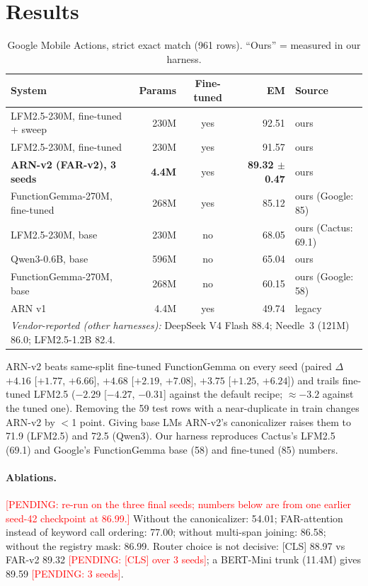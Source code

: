 \documentclass[11pt]{article}
\newcommand{\PENDING}[1]{\textcolor{red}{[PENDING: #1]}}
\newcommand{\arn}{ARN-v2}
\begin{document}
\section{Results}\label{sec:results}
\begin{table}[t]\centering\small
\caption{Google Mobile Actions, strict exact match (961 rows). ``Ours'' = measured in our harness.}
\begin{tabular}{lrcrl}\toprule
System & Params & Fine-tuned & EM & Source\\\midrule
LFM2.5-230M, fine-tuned + sweep & 230M & yes & 92.51 & ours\\
LFM2.5-230M, fine-tuned & 230M & yes & 91.57 & ours\\
\textbf{\arn{} (FAR-v2), 3 seeds} & \textbf{4.4M} & yes & \textbf{89.32 $\pm$ 0.47} & ours\\
FunctionGemma-270M, fine-tuned & 268M & yes & 85.12 & ours (Google: 85)\\
LFM2.5-230M, base & 230M & no & 68.05 & ours (Cactus: 69.1)\\
Qwen3-0.6B, base & 596M & no & 65.04 & ours\\
FunctionGemma-270M, base & 268M & no & 60.15 & ours (Google: 58)\\
ARN v1 & 4.4M & yes & 49.74 & legacy\\\midrule
\multicolumn{5}{l}{\emph{Vendor-reported (other harnesses):} DeepSeek V4 Flash 88.4; Needle~3 (121M) 86.0; LFM2.5-1.2B 82.4.}\\\bottomrule
\end{tabular}\end{table}

\arn{} beats same-split fine-tuned FunctionGemma on every seed (paired $\Delta$ $+4.16$ [$+1.77$, $+6.66$],
$+4.68$ [$+2.19$, $+7.08$], $+3.75$ [$+1.25$, $+6.24$]) and trails fine-tuned LFM2.5 ($-2.29$
[$-4.27$, $-0.31$] against the default recipe; $\approx -3.2$ against the tuned one). Removing the 59 test rows
with a near-duplicate in train changes \arn{} by $<$1 point. Giving base LMs \arn{}'s canonicalizer raises
them to 71.9 (LFM2.5) and 72.5 (Qwen3). Our harness reproduces Cactus's LFM2.5 (69.1) and Google's
FunctionGemma base (58) and fine-tuned (85) numbers.

\paragraph{Ablations.} \PENDING{re-run on the three final seeds; numbers below are from one earlier
seed-42 checkpoint at 86.99.} Without the canonicalizer: 54.01; FAR-attention instead of keyword call
ordering: 77.00; without multi-span joining: 86.58; without the registry mask: 86.99.
Router choice is not decisive: [CLS] 88.97 vs FAR-v2 89.32 \PENDING{[CLS] over 3 seeds};
a BERT-Mini trunk (11.4M) gives 89.59 \PENDING{3 seeds}.
\end{document}
